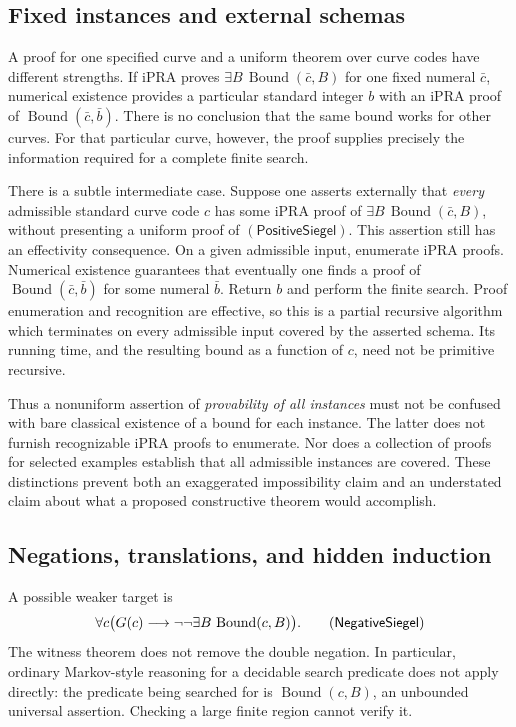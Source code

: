 \subsection{Fixed instances and external schemas}

A proof for one specified curve and a uniform theorem over curve codes
have different strengths.  If iPRA proves
$\exists B\,\operatorname{Bound}(\bar c,B)$ for one fixed numeral
$\bar c$, numerical existence provides a particular standard integer
$b$ with an iPRA proof of $\operatorname{Bound}(\bar c,\bar b)$.
There is no conclusion that the same bound works for other curves.
For that particular curve, however, the proof supplies precisely the
information required for a complete finite search.

There is a subtle intermediate case.  Suppose one asserts externally
that \emph{every} admissible standard curve code $c$ has some iPRA proof
of $\exists B\,\operatorname{Bound}(\bar c,B)$, without presenting a
uniform proof of $(\mathsf{PositiveSiegel})$.  This assertion still has
an effectivity consequence.  On a given admissible input, enumerate iPRA
proofs.  Numerical existence guarantees that eventually one finds a
proof of $\operatorname{Bound}(\bar c,\bar b)$ for some numeral
$\bar b$.  Return $b$ and perform the finite search.  Proof enumeration
and recognition are effective, so this is a partial recursive algorithm
which terminates on every admissible input covered by the asserted
schema.  Its running time, and the resulting bound as a function of $c$,
need not be primitive recursive.

Thus a nonuniform assertion of \emph{provability of all instances}
must not be confused with bare classical existence of a bound for
each instance.  The latter does not furnish recognizable iPRA proofs
to enumerate.  Nor does a collection of proofs for selected examples
establish that all admissible instances are covered.  These distinctions
prevent both an exaggerated impossibility claim and an understated
claim about what a proposed constructive theorem would accomplish.

\subsection{Negations, translations, and hidden induction}

A possible weaker target is
\[
 \forall c\bigl(G(c)\longrightarrow
              \neg\neg\exists B\,\operatorname{Bound}(c,B)\bigr).
 \tag{\textsf{NegativeSiegel}}
\]
The witness theorem does not remove the double negation.  In particular,
ordinary Markov-style reasoning for a decidable search predicate does
not apply directly: the predicate being searched for is
$\operatorname{Bound}(c,B)$, an unbounded universal assertion.  Checking
a large finite region cannot verify it.

